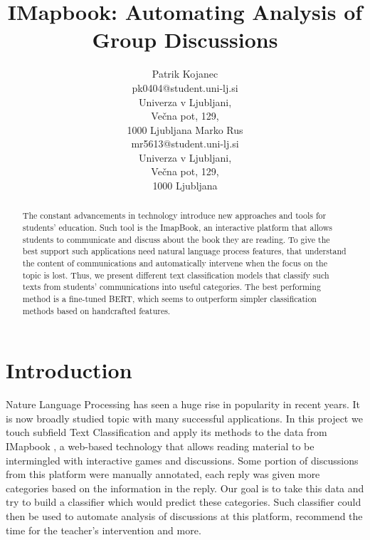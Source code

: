\documentclass[11pt,a4paper]{article}
\title{IMapbook: Automating Analysis of Group Discussions}
\author{ \and }
\author{Patrik Kojanec \\ pk0404@student.uni-lj.si  \\ Univerza v Ljubljani,\\ Ve\v cna pot, 129,\\ 1000 Ljubljana
        \And
        Marko Rus \\ mr5613@student.uni-lj.si\\ Univerza v Ljubljani,\\ Ve\v cna pot, 129,\\ 1000 Ljubljana}
\date{}
\begin{document}
\maketitle

\begin{abstract} 
The constant advancements in technology introduce new approaches and tools for students' education. Such tool is the ImapBook, an interactive platform that allows students to communicate and discuss about the book they are reading. To give the best support such applications need natural language process features, that understand the content of communications and automatically intervene when the focus on the topic is lost. Thus, we present different text classification models that classify such texts from students' communications into useful categories. The best performing method is a fine-tuned BERT, which seems to outperform simpler classification methods based on handcrafted features.
\end{abstract}

\section{Introduction}
Nature Language Processing has seen a huge rise in popularity in recent years. It is now broadly studied topic with many successful applications. In this project we touch subfield Text Classification and apply its methods to the data from IMapbook \cite{imapbook}, a web-based technology that allows reading material to be intermingled with interactive games and discussions. Some portion of discussions from this platform were manually annotated, each reply was given more categories based on the information in the reply. Our goal is to  take this data and try to build a classifier which would predict these categories. Such classifier could then be used to automate analysis of discussions at this platform, recommend the time for the teacher’s intervention and more.
\end{document}
